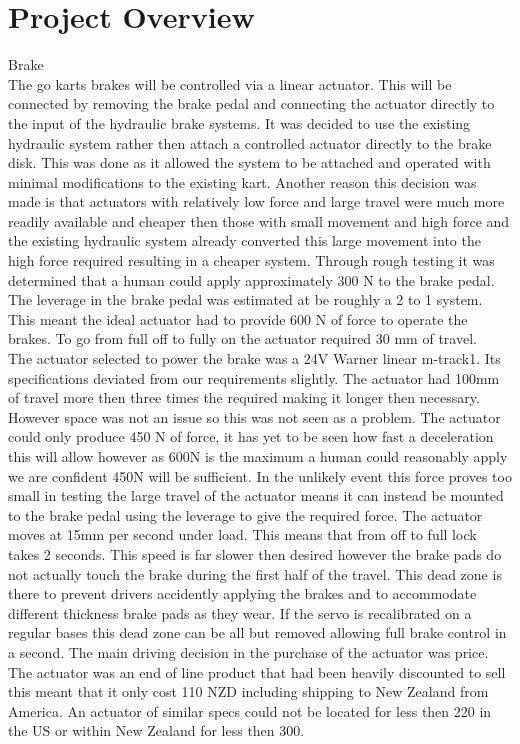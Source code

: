 \chapter{Project Overview}

Brake\\
The go karts brakes will be controlled via a linear actuator. This will be connected by removing the brake pedal and connecting the actuator directly to the input of the hydraulic brake systems. It was decided to use the existing hydraulic system rather then attach a controlled actuator directly to the brake disk. This was done as it allowed the system to be attached and operated with minimal modifications to the existing kart. Another reason this decision was made is that actuators with relatively low force and large travel were much more readily available and cheaper then those with small movement and high force and the existing hydraulic system already converted this large movement into the high force required resulting in a cheaper system. Through rough testing it was determined that a human could apply approximately 300 N to the brake pedal. The leverage in the brake pedal was estimated at be roughly a 2 to 1 system. This meant the ideal actuator had to provide 600 N of force to operate the brakes. To go from full off to fully on the actuator required 30 mm of travel.\\ 
The actuator selected to power the brake was a 24V Warner linear m-track1. Its specifications deviated from our requirements slightly. The actuator had 100mm of travel more then three times the required making it longer then necessary. However space was not an issue so this was not seen as a problem. The actuator could only produce 450 N of force, it has yet to be seen how fast a deceleration this will allow however as 600N is the maximum a human could reasonably apply we are confident 450N will be sufficient. In the unlikely event this force proves too small in testing the large travel of the actuator means it can instead be mounted to the brake pedal using the leverage to give the required force. The actuator moves at 15mm per second under load. This means that from off to full lock takes 2 seconds. This speed is far slower then desired however the brake pads do not actually touch the brake during the first half of the travel. This dead zone is there to prevent drivers accidently applying the brakes and to accommodate different thickness brake pads as they wear. If the servo is recalibrated on a regular bases this dead zone can be all but removed allowing full brake control in a second. The main driving decision in the purchase of the actuator was price. The actuator was an end of line product that had been heavily discounted to sell this meant that it only cost 110 NZD including shipping to New Zealand from America. An actuator of similar specs could not be located for less then 220 in the US or within New Zealand for less then 300.\\

